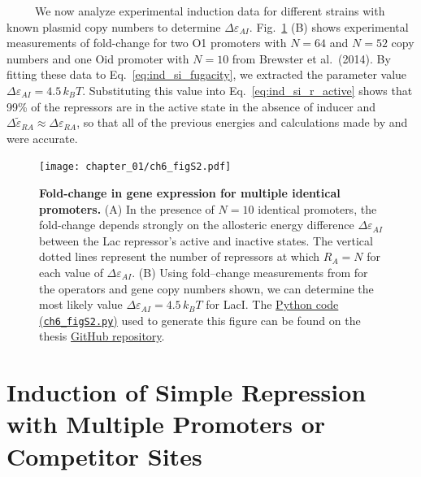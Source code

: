\documentclass[12pt]{caltech_thesis}
\begin{document}
~~~~~We now analyze experimental induction data for different strains
with known plasmid copy numbers to determine \(\Delta\varepsilon_{AI}\).
Fig.~\ref{fig:fugacity} (B) shows experimental measurements of
fold-change for two O1 promoters with \(N=64\) and \(N=52\) copy numbers
and one Oid promoter with \(N=10\) from Brewster et al.~(2014). By
fitting these data to Eq.~\ref{eq:ind_si_fugacity}, we extracted the
parameter value \(\Delta\varepsilon_{AI} = 4.5\,k_B T\). Substituting
this value into Eq.~\ref{eq:ind_si_r_active} shows that 99\% of the
repressors are in the active state in the absence of inducer and
\(\Delta\tilde{\varepsilon}_{RA} \approx \Delta\varepsilon_{RA}\), so
that all of the previous energies and calculations made by
\textcite{garcia2011} and \textcite{brewster2014} were accurate.

\hypertarget{fig:fugacity}{%
\begin{figure}
\centering
\texttt{[image: chapter\_01/ch6\_figS2.pdf]}
\caption[{Fold-change in gene expression for multiple identical
promoters.}]{\textbf{Fold-change in gene expression for multiple
identical promoters.} (A) In the presence of \(N=10\) identical
promoters, the fold-change depends strongly on the allosteric energy
difference \(\Delta\varepsilon_{AI}\) between the Lac repressor's active
and inactive states. The vertical dotted lines represent the number of
repressors at which \(R_A = N\) for each value of
\(\Delta\varepsilon_{AI}\). (B) Using fold--change measurements from
\textcite{brewster2014} for the operators and gene copy numbers shown,
we can determine the most likely value
\(\Delta\varepsilon_{AI} = 4.5\, k_BT\) for LacI. The
\href{https://github.com/gchure/phd/blob/master/src/chapter_06/code/ch6_figS2.py}{Python
code (\texttt{ch6\_figS2.py})} used to generate this figure can be found
on the thesis \href{https://github.com/gchure/phd}{GitHub repository}.}
\label{fig:fugacity}
\end{figure}
}

\hypertarget{induction-of-simple-repression-with-multiple-promoters-or-competitor-sites}{%
\section{Induction of Simple Repression with Multiple Promoters or
Competitor
Sites}\label{induction-of-simple-repression-with-multiple-promoters-or-competitor-sites}}
\end{document}
